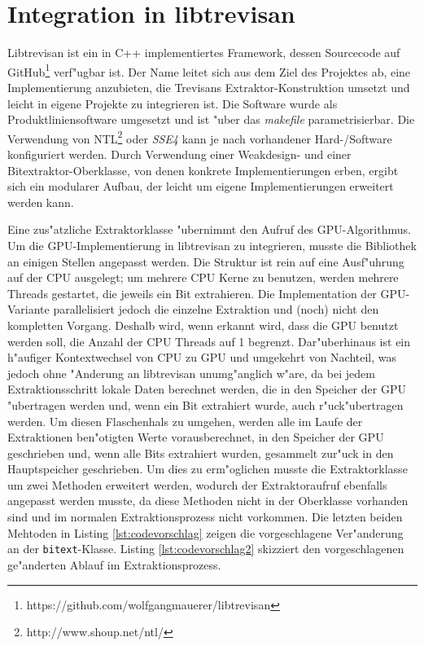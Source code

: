 \section{Integration in libtrevisan}
\label{sec:integration}


Libtrevisan ist ein in C++ implementiertes Framework, dessen Sourcecode auf GitHub\footnote{https://github.com/wolfgangmauerer/libtrevisan} verf"ugbar ist. Der Name leitet sich aus dem Ziel des Projektes ab, eine Implementierung anzubieten, die Trevisans Extraktor-Konstruktion umsetzt und leicht in eigene Projekte zu integrieren ist. Die Software wurde als Produktliniensoftware umgesetzt und ist "uber das \emph{makefile} parametrisierbar. Die Verwendung von NTL\footnote{http://www.shoup.net/ntl/} oder \emph{SSE4} kann je nach vorhandener Hard-/Software konfiguriert werden. Durch Verwendung einer Weakdesign- und einer Bitextraktor-Oberklasse, von denen konkrete Implementierungen erben, ergibt sich ein modularer Aufbau, der leicht um eigene Implementierungen erweitert werden kann.

Eine zus"atzliche Extraktorklasse "ubernimmt den Aufruf des GPU-Algorithmus. Um die GPU-Imple\-mentierung in libtrevisan zu integrieren, musste die Bibliothek an einigen Stellen angepasst werden. Die Struktur ist rein auf eine Ausf"uhrung auf der CPU ausgelegt; um mehrere CPU Kerne zu benutzen, werden mehrere Threads gestartet, die jeweils ein Bit extrahieren. Die Implementation der GPU-Variante parallelisiert jedoch die einzelne Extraktion und (noch) nicht den kompletten Vorgang. Deshalb wird, wenn erkannt wird, dass die GPU benutzt werden soll, die Anzahl der CPU Threads auf 1 begrenzt. Dar"uberhinaus ist ein h"aufiger Kontextwechsel von CPU zu GPU und umgekehrt von Nachteil, was jedoch ohne "Anderung an libtrevisan unumg"anglich w"are, da bei jedem Extraktionsschritt lokale Daten berechnet werden, die in den Speicher der GPU "ubertragen werden und, wenn ein Bit extrahiert wurde, auch r"uck"ubertragen werden. Um diesen Flaschenhals zu umgehen, werden alle im Laufe der Extraktionen ben"otigten Werte vorausberechnet, in den Speicher der GPU geschrieben und, wenn alle Bits extrahiert wurden, gesammelt zur"uck in den Hauptspeicher geschrieben. Um dies zu erm"oglichen musste die Extraktorklasse um zwei Methoden erweitert werden, wodurch der Extraktoraufruf ebenfalls angepasst werden musste, da diese Methoden nicht in der Oberklasse vorhanden sind und im normalen Extraktionsprozess nicht vorkommen. Die letzten beiden Mehtoden in Listing \ref{lst:codevorschlag} zeigen die vorgeschlagene Ver"anderung an der \texttt{bitext}-Klasse. Listing \ref{lst:codevorschlag2} skizziert den vorgeschlagenen ge"anderten Ablauf im Extraktionsprozess.

